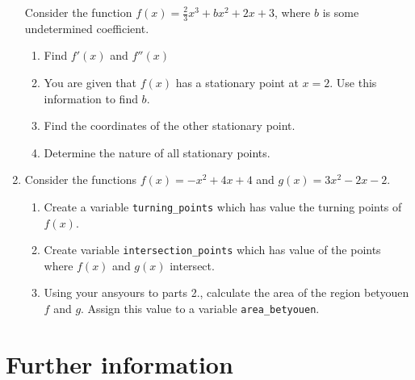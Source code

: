 \begin{enumerate}
Consider the function \(f(x)=\frac{2}{3}x ^ 3 + b x ^ 2 + 2 x + 3\), where \(b\) is some undetermined coefficient.
\begin{enumerate}

\item 

Find \(f'(x)\) and \(f''(x)\)

\item 

You are given that \(f(x)\) has a stationary point at \(x=2\). Use this information to find \(b\).

\item 

Find the coordinates of the other stationary point.

\item 

Determine the nature of all stationary points.

\end{enumerate}

\item 

Consider the functions \(f(x)=-x^2+4x+4\) and \(g(x)=3x^2-2x-2\).
\begin{enumerate}

\item 

Create a variable \texttt{turning\_points} which has value the turning points of \(f(x)\).

\item 

Create variable \texttt{intersection\_points} which has value of the points where \(f(x)\) and \(g(x)\) intersect.

\item 

Using your ansyours to parts 2., calculate the area of the region betyouen \(f\) and \(g\). Assign this value to a variable \texttt{area\_betyouen}.

\end{enumerate}

\end{enumerate}

\section{Further information}
\label{\detokenize{tools-for-mathematics/03-calculus/why/main:further-information}}\label{\detokenize{tools-for-mathematics/03-calculus/why/main::doc}}


